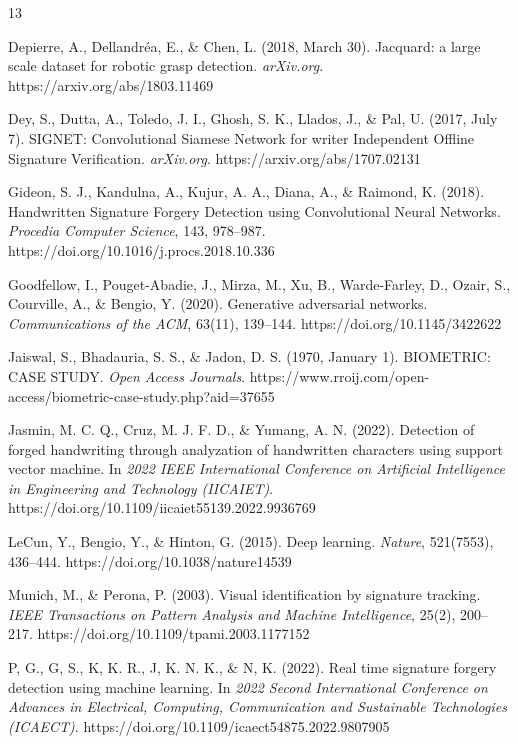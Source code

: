 \documentclass[12pt]{article}
\begin{document}
\begin{thebibliography}{13}

Depierre, A., Dellandréa, E., \& Chen, L. (2018, March 30). Jacquard: a large scale dataset for robotic grasp detection. \textit{arXiv.org}. https://arxiv.org/abs/1803.11469

Dey, S., Dutta, A., Toledo, J. I., Ghosh, S. K., Llados, J., \& Pal, U. (2017, July 7). SIGNET: Convolutional Siamese Network for writer Independent Offline Signature Verification. \textit{arXiv.org}. https://arxiv.org/abs/1707.02131

Gideon, S. J., Kandulna, A., Kujur, A. A., Diana, A., \& Raimond, K. (2018). Handwritten Signature Forgery Detection using Convolutional Neural Networks. \textit{Procedia Computer Science}, 143, 978–987. https://doi.org/10.1016/j.procs.2018.10.336

Goodfellow, I., Pouget-Abadie, J., Mirza, M., Xu, B., Warde-Farley, D., Ozair, S., Courville, A., \& Bengio, Y. (2020). Generative adversarial networks. \textit{Communications of the ACM}, 63(11), 139–144. https://doi.org/10.1145/3422622

Jaiswal, S., Bhadauria, S. S., \& Jadon, D. S. (1970, January 1). BIOMETRIC: CASE STUDY. \textit{Open Access Journals}. https://www.rroij.com/open-access/biometric-case-study.php?aid=37655

Jasmin, M. C. Q., Cruz, M. J. F. D., \& Yumang, A. N. (2022). Detection of forged handwriting through analyzation of handwritten characters using support vector machine. In \textit{2022 IEEE International Conference on Artificial Intelligence in Engineering and Technology (IICAIET)}. https://doi.org/10.1109/iicaiet55139.2022.9936769

LeCun, Y., Bengio, Y., \& Hinton, G. (2015). Deep learning. \textit{Nature}, 521(7553), 436–444. https://doi.org/10.1038/nature14539

Munich, M., \& Perona, P. (2003). Visual identification by signature tracking. \textit{IEEE Transactions on Pattern Analysis and Machine Intelligence}, 25(2), 200–217. https://doi.org/10.1109/tpami.2003.1177152

P, G., G, S., K, K. R., J, K. N. K., \& N, K. (2022). Real time signature forgery detection using machine learning. In \textit{2022 Second International Conference on Advances in Electrical, Computing, Communication and Sustainable Technologies (ICAECT)}. https://doi.org/10.1109/icaect54875.2022.9807905


\end{thebibliography}
\end{document}
